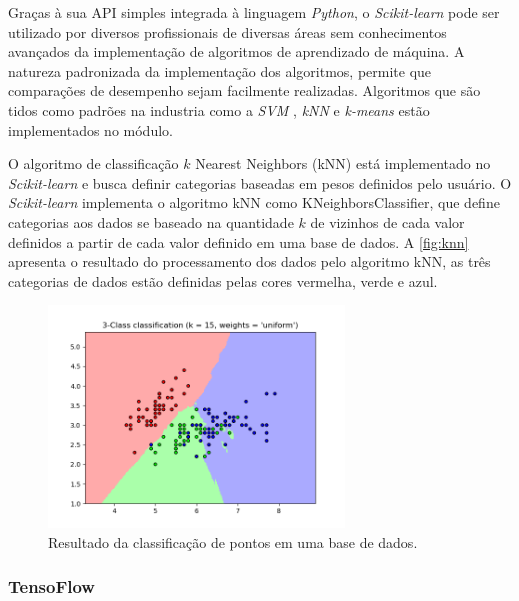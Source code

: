Graças à sua API simples integrada à linguagem \textit{Python}, o \textit{Scikit-learn} pode ser utilizado por diversos profissionais de diversas áreas sem conhecimentos avançados da implementação de algoritmos de aprendizado de máquina. A natureza padronizada da implementação dos algoritmos, permite que comparações de desempenho sejam facilmente realizadas. Algoritmos que são tidos como padrões na industria como a \textit{SVM} \cite{cortes:1995svm}, \textit{kNN} \cite{cover:1967knn} e \textit{k-means} \cite{macqueen:1967kmeans} estão implementados no módulo. \cite{scikit-learn}

O algoritmo de classificação $k$ Nearest Neighbors (kNN) está implementado no \textit{Scikit-learn} e busca definir categorias baseadas em pesos definidos pelo usuário. O \textit{Scikit-learn} implementa o algoritmo kNN como KNeighborsClassifier, que define categorias aos dados se baseado na quantidade $k$ de vizinhos de cada valor definidos a partir de cada valor definido em uma base de dados. A \autoref{fig:knn} apresenta o resultado do processamento dos dados pelo algoritmo kNN, as três categorias de dados estão definidas pelas cores vermelha, verde e azul.

\begin{figure}
    \centering
    \includegraphics[width=0.7\textwidth, keepaspectratio]{resources/knn.png}
    \caption{Resultado da classificação de pontos em uma base de dados. \cite{scikit-learn}}
    \label{fig:knn}
\end{figure}


\subsubsection{TensoFlow}

